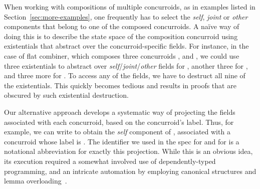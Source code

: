 When working with compositions of multiple concurroids, as in examples
listed in Section~\ref{sec:more-examples}, one frequently has to
select the \emph{self}, \emph{joint} or \emph{other} components that
belong to one of the composed concurroids. A na\"{i}ve way of doing
this is to describe the state space of the composition concurroid
using existentials that abstract over the concurroid-specific
fields. For instance, in the case of flat combiner, which composes
three concurroids ,  and , we
could use three existentials to abstract over
\emph{self}/\emph{joint}/\emph{other} fields for , another
three for , and three more for . To
access any of the fields, we have to destruct all nine of the
existentials. This quickly becomes tedious and results in proofs that
are obscured by such existential destruction.

Our alternative approach develops a systematic way of projecting the
fields associated with each concurroid, based on the concurroid's
label. Thus, for example, we can write  to obtain
the \emph{self} component of , associated with a concurroid
whose label is . The identifier  we used in the
spec for  and for  is a notational
abbreviation for exactly this projection. While this is an obvious
idea, its execution required a somewhat involved use of
dependently-typed programming, and an intricate automation by
employing canonical structures and lemma
overloading~\cite{Gonthier-al:ICFP11,Mahboubi-Tassi:ITP13}.

